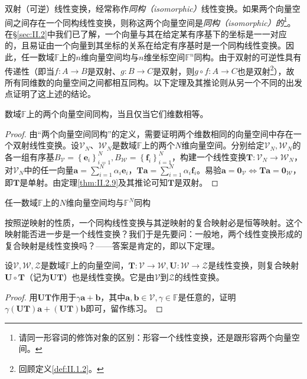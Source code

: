 \documentclass[main.tex]{subfiles}
\begin{document}
双射（可逆）线性变换，经常称作\emph{同构（isomorphic）}线性变换。如果两个向量空间之间存在一个同构线性变换，则称这两个向量空间是\emph{同构（isomorphic）的}\footnote{请同一形容词的修饰对象的区别：形容一个线性变换，还是跟形容两个向量空间。}。在\S\ref{sec:II.2}中我们已了解，一个向量与其在给定某有序基下的坐标是一一对应的，且易证由一个向量到其坐标的关系在给定有序基时是一个同构线性变换。因此，任一数域$\mathbb{F}$上的$n$维向量空间均与$n$维坐标空间$\mathbb{F}^n$同构。由于双射的可逆性具有传递性（即当$f:A\rightarrow B$是双射、$g:B\rightarrow C$是双射，则$g\circ f:A\rightarrow C$也是双射\footnote{回顾定义\ref{def:II.1.2}。}），故所有同维数的向量空间之间都相互同构。以下定理及其推论则从另一个不同的出发点证明了这上述的结论。

\begin{theorem}\label{thm:II.2.11}
    数域$\mathbb{F}$上的两个向量空间同构，当且仅当它们维数相等。
\end{theorem}
\begin{proof}
    由“两个向量空间同构”的定义，需要证明两个维数相同的向量空间中存在一个双射线性变换。设$\mathcal{V}_N$、$\mathcal{W}_N$是数域$\mathbb{F}$上的两个$N$维向量空间。分别给定$\mathcal{V}_N,\mathcal{W}_N$的各一组有序基$B_{\mathcal{V}}=\left\{\mathbf{e}_i\right\}_{i=1}^N, B_{\mathcal{W}}=\left\{\mathbf{f}_i\right\}_{i=1}^N$，构建一个线性变换$\mathbf{T}:\mathcal{V}_N\rightarrow\mathcal{W}_N$，对$\mathcal{V}_N$中的任一向量$\mathbf{a}=\sum_{i=1}^N\alpha_i\mathbf{e}_i$，$\mathbf{Ta}=\sum_{i=1}^N\alpha_i\mathbf{f}_i$。易验$\mathbf{a}=\mathbf{0}_{\mathcal{V}}\Leftrightarrow\mathbf{Ta}=\mathbf{0}_{\mathcal{W}}$，即$\mathbf{T}$是单射。由定理\ref{thm:II.2.9}及其推论可知$\mathbf{T}$是双射。
\end{proof}

\begin{corollary}
    任一数域$\mathbb{F}$上的$N$维向量空间均与$\mathbb{F}^N$同构
\end{corollary}

按照逆映射的性质，一个同构线性变换与其逆映射的复合映射必是恒等映射。这个映射能否进一步是一个线性变换？我们于是先要问：一般地，两个线性变换形成的复合映射是线性变换吗？——答案是肯定的，即以下定理。

\begin{theorem}\label{thm:II.2.12}
    设$\mathcal{V},\mathcal{W},\mathcal{Z}$是数域$\mathbb{F}$上的向量空间，$\mathbf{T}:\mathcal{V}\rightarrow\mathcal{W},\mathbf{U}:\mathcal{W}\rightarrow\mathcal{Z}$是线性变换，则复合映射$\mathbf{U}\circ\mathbf{T}$（记为$\mathbf{UT}$）也是线性变换。它是由$\mathcal{V}$到$\mathcal{Z}$的线性变换。
\end{theorem}
\begin{proof}
    用$\mathbf{UT}$作用于$\gamma\mathbf{a}+\mathbf{b}$，其中$\mathbf{a},\mathbf{b}\in\mathcal{V},\gamma\in\mathbb{F}$是任意的，证明$\gamma\left(\mathbf{UT}\right)\mathbf{a}+\left(\mathbf{UT}\right)\mathbf{b}$即可，留作练习。
\end{proof}
\end{document}
